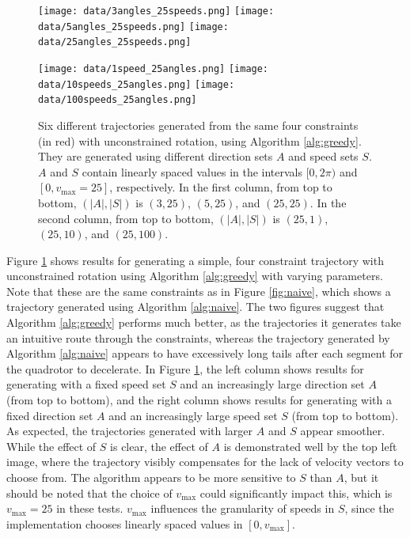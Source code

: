 \documentclass[pageno]{jpaper}
\begin{document}
\begin{figure}
  \begin{minipage}{0.5\linewidth}
    \texttt{[image: data/3angles\_25speeds.png]}
    \texttt{[image: data/5angles\_25speeds.png]}
    \texttt{[image: data/25angles\_25speeds.png]}
  \end{minipage}
  \begin{minipage}{0.5\linewidth}
    \texttt{[image: data/1speed\_25angles.png]}
    \texttt{[image: data/10speeds\_25angles.png]}
    \texttt{[image: data/100speeds\_25angles.png]}
  \end{minipage}
  \caption{Six different trajectories generated from the same four constraints (in red) with unconstrained rotation, using Algorithm \ref{alg:greedy}. They are generated using different direction sets $A$ and speed sets $S$. $A$ and $S$ contain linearly spaced values in the intervals $[0, 2\pi)$ and $[0, v_{\max} = 25]$, respectively. In the first column, from top to bottom, $(|A|, |S|)$ is $(3, 25)$, $(5, 25)$, and $(25, 25)$. In the second column, from top to bottom, $(|A|, |S|)$ is $(25, 1)$, $(25, 10)$, and $(25, 100)$.}
  \label{fig:greedy}
\end{figure}

Figure \ref{fig:greedy} shows results for generating a simple, four constraint trajectory with unconstrained rotation using Algorithm \ref{alg:greedy} with varying parameters. Note that these are the same constraints as in Figure \ref{fig:naive}, which shows a trajectory generated using Algorithm \ref{alg:naive}. The two figures suggest that Algorithm \ref{alg:greedy} performs much better, as the trajectories it generates take an intuitive route through the constraints, whereas the trajectory generated by Algorithm \ref{alg:naive} appears to have excessively long tails after each segment for the quadrotor to decelerate. In Figure \ref{fig:greedy}, the left column shows results for generating with a fixed speed set $S$ and an increasingly large direction set $A$ (from top to bottom), and the right column shows results for generating with a fixed direction set $A$ and an increasingly large speed set $S$ (from top to bottom). As expected, the trajectories generated with larger $A$ and $S$ appear smoother. While the effect of $S$ is clear, the effect of $A$ is demonstrated well by the top left image, where the trajectory visibly compensates for the lack of velocity vectors to choose from. The algorithm appears to be more sensitive to $S$ than $A$, but it should be noted that the choice of $v_{\max}$ could significantly impact this, which is $v_{\max} = 25$ in these tests. $v_{\max}$ influences the granularity of speeds in $S$, since the implementation chooses linearly spaced values in $[0, v_{\max}]$.
\end{document}
